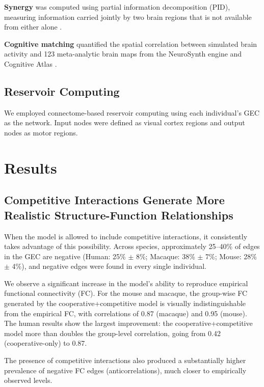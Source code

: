 \documentclass{article}
\begin{document}
\textbf{Synergy} was computed using partial information decomposition (PID), measuring information carried jointly by two brain regions that is not available from either alone \citep{luppi2022synergistic, mediano2021towards, rosas2019quantifying}.

\textbf{Cognitive matching} quantified the spatial correlation between simulated brain activity and 123 meta-analytic brain maps from the NeuroSynth engine and Cognitive Atlas \citep{luppi2022synergistic, yarkoni2011large, poldrack2011cognitive}.

\subsection{Reservoir Computing}

We employed connectome-based reservoir computing \citep{suarez2021connectome, zamora2023functional} using each individual's GEC as the network. Input nodes were defined as visual cortex regions and output nodes as motor regions.

\section{Results}

\subsection{Competitive Interactions Generate More Realistic Structure-Function Relationships}

When the model is allowed to include competitive interactions, it consistently takes advantage of this possibility. Across species, approximately 25--40\% of edges in the GEC are negative (Human: 25\% $\pm$ 8\%; Macaque: 38\% $\pm$ 7\%; Mouse: 28\% $\pm$ 4\%), and negative edges were found in every single individual.

We observe a significant increase in the model's ability to reproduce empirical functional connectivity (FC). For the mouse and macaque, the group-wise FC generated by the cooperative+competitive model is visually indistinguishable from the empirical FC, with correlations of 0.87 (macaque) and 0.95 (mouse). The human results show the largest improvement: the cooperative+competitive model more than doubles the group-level correlation, going from 0.42 (cooperative-only) to 0.87.

The presence of competitive interactions also produced a substantially higher prevalence of negative FC edges (anticorrelations), much closer to empirically observed levels.
\end{document}
